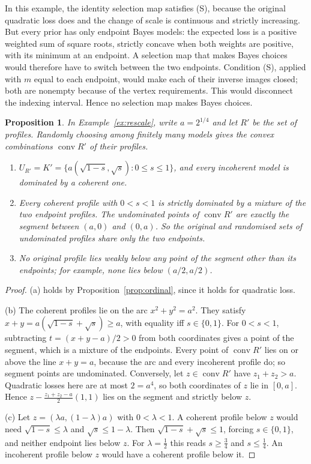 \documentclass[11pt]{article}
\newtheorem{proposition}[theorem]{Proposition}
\theoremstyle{definition}
\theoremstyle{remark}
\newcommand{\co}{\operatorname{conv}}
\begin{document}
In this example, the identity selection map satisfies (S), because the original quadratic loss does and the change of scale is continuous and strictly increasing. But every prior has only endpoint Bayes models: the expected loss is a positive weighted sum of square roots, strictly concave when both weights are positive, with its minimum at an endpoint. A selection map that makes Bayes choices would therefore have to switch between the two endpoints. Condition (S), applied with $m$ equal to each endpoint, would make each of their inverse images closed; both are nonempty because of the vertex requirements. This would disconnect the indexing interval. Hence no selection map makes Bayes choices.

\begin{proposition}\label{prop:random}
In Example~\ref{ex:rescale}, write $a=2^{1/4}$ and let $R'$ be the set of profiles. Randomly choosing among finitely many models gives the convex combinations $\co R'$ of their profiles.
\begin{enumerate}[label=(\alph*)]
\item $U_{R'}=K'=\{a(\sqrt{1-s},\sqrt s):0\le s\le1\}$, and every incoherent model is dominated by a coherent one.
\item Every coherent profile with $0<s<1$ is strictly dominated by a mixture of the two endpoint profiles. The undominated points of $\co R'$ are exactly the segment between $(a,0)$ and $(0,a)$. So the original and randomised sets of undominated profiles share only the two endpoints.
\item No original profile lies weakly below any point of the segment other than its endpoints; for example, none lies below $(a/2,a/2)$.
\end{enumerate}
\end{proposition}
\begin{proof}
(a) holds by Proposition~\ref{prop:ordinal}, since it holds for quadratic loss.

(b) The coherent profiles lie on the arc $x^2+y^2=a^2$. They satisfy $x+y=a(\sqrt{1-s}+\sqrt s)\ge a$, with equality iff $s\in\{0,1\}$. For $0<s<1$, subtracting $t=(x+y-a)/2>0$ from both coordinates gives a point of the segment, which is a mixture of the endpoints. Every point of $\co R'$ lies on or above the line $x+y=a$, because the arc and every incoherent profile do; so segment points are undominated. Conversely, let $z\in\co R'$ have $z_1+z_2>a$. Quadratic losses here are at most $2=a^4$, so both coordinates of $z$ lie in $[0,a]$. Hence $z-\tfrac{z_1+z_2-a}2(1,1)$ lies on the segment and strictly below $z$.

(c) Let $z=(\lambda a,(1-\lambda)a)$ with $0<\lambda<1$. A coherent profile below $z$ would need $\sqrt{1-s}\le\lambda$ and $\sqrt s\le1-\lambda$. Then $\sqrt{1-s}+\sqrt s\le1$, forcing $s\in\{0,1\}$, and neither endpoint lies below $z$. For $\lambda=\tfrac12$ this reads $s\ge\tfrac34$ and $s\le\tfrac14$. An incoherent profile below $z$ would have a coherent profile below it.
\end{proof}
\end{document}
